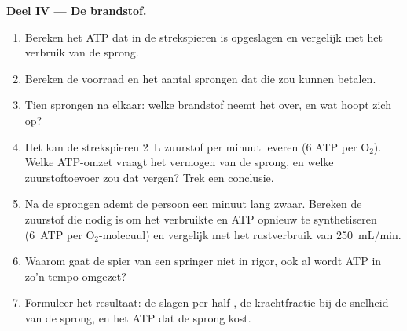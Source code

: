 \begin{problem}
\medskip
\noindent\textbf{Deel IV --- De brandstof.}
\begin{enumerate}[resume]
  \item Bereken het ATP dat in de strekspieren is opgeslagen en vergelijk
        met het verbruik van de sprong.
  \item Bereken de voorraad  en het aantal sprongen dat die
        zou kunnen betalen.
  \item Tien sprongen na elkaar: welke brandstof neemt het over, en wat
        hoopt zich op?
  \item Het  kan de strekspieren \qty{2}{L} zuurstof per minuut leveren
        (6 ATP per $\mathrm{O_2}$). Welke ATP-omzet vraagt het vermogen van de
        sprong, en welke zuurstoftoevoer zou dat vergen? Trek een conclusie.
  \item Na de sprongen ademt de persoon een minuut lang zwaar. Bereken de
        zuurstof die nodig is om het verbruikte  en ATP opnieuw
        te synthetiseren (\qty{6}{ATP} per $\mathrm{O_2}$-molecuul) en
        vergelijk met het rustverbruik van \qty{250}{mL/min}.
  \item Waarom gaat de spier van een springer niet in rigor, ook al wordt ATP
        in zo'n tempo omgezet?
  \item Formuleer het resultaat: de slagen per half , de
        krachtfractie bij de snelheid van de sprong, en het ATP dat de sprong
        kost.
\end{enumerate}
\end{problem}

